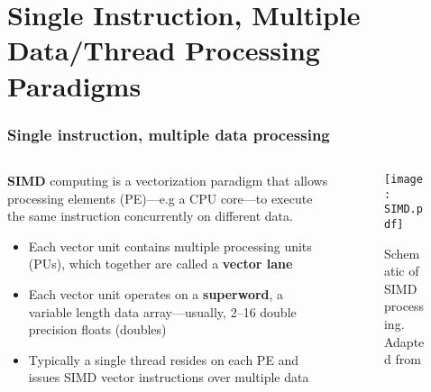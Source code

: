\documentclass{beamer}
\newcounter{dummynote1}%
\newcounter{dummynote2}%
\begin{document}
\section{Single Instruction, Multiple Data\slash Thread Processing Paradigms}

\begin{frame}
 \frametitle{Single instruction, multiple data processing}
 \setcounter{dummynote1}{\value{footnote}}
 \addtocounter{dummynote1}{1}
 \begin{columns}
 \begin{column}{0.6\textwidth}
  \textbf{SIMD} computing is a vectorization paradigm that allows processing elements (PE)---e.g a CPU core---to execute the same instruction concurrently on different data.
  \begin{itemize}
    \item Each vector unit contains multiple processing units (PUs), which together are called a \textbf{vector lane}
    \item Each vector unit operates on a \textbf{superword}, a variable length data array---usually, \numrange{2}{16} double precision floats (doubles)
    \item Typically a single thread resides on each PE and issues SIMD vector instructions over multiple data
  \end{itemize}
 \end{column}
 \begin{column}{0.4\textwidth}
  \begin{figure}
    \centering
    \texttt{[image: SIMD.pdf]}
    \caption{Schematic of SIMD processing.  Adapted from\footnotemark[\value{dummynote1}]}
  \end{figure}
 \end{column}
 \end{columns}
 \setcounter{footnote}{\value{dummynote1}}
\end{frame}
\end{document}
